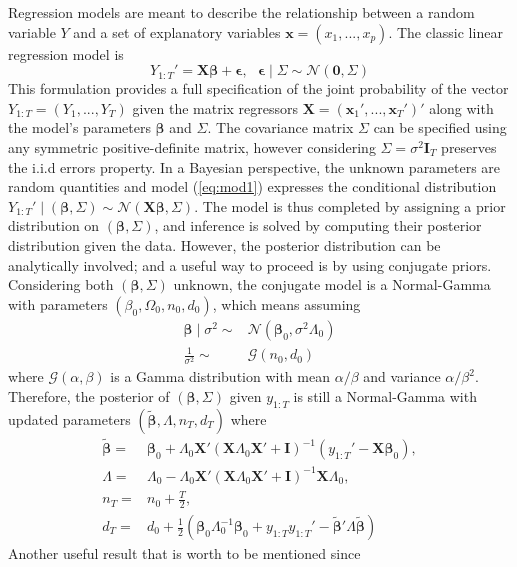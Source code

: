 \documentclass[
  12pt,
]{book}
\theoremstyle{break}
\theoremstyle{nonumberplain}
\begin{document}
Regression models are meant to describe the relationship between a
random variable \(Y\) and a set of explanatory variables
\(\boldsymbol x=(x_{1},...,x_{p})\). The classic linear regression model
is \begin{equation}\label{eq:mod1}
Y_{1:T}'=\boldsymbol{X}\boldsymbol{\beta}+\boldsymbol{\epsilon}, \ \ \ \boldsymbol{\epsilon}\mid\Sigma\sim\mathcal{N}(\boldsymbol{0},\Sigma)
\end{equation} This formulation provides a full specification of the
joint probability of the vector \(Y_{1:T}=(Y_{1},...,Y_{T})\) given the
matrix regressors
\(\boldsymbol X = (\boldsymbol x_{1}',...,\boldsymbol x_{T}')'\) along
with the model's parameters \(\boldsymbol \beta\) and \(\Sigma\). The
covariance matrix \(\Sigma\) can be specified using any symmetric
positive-definite matrix, however considering
\(\Sigma=\sigma^{2}\boldsymbol{I}_{T}\) preserves the i.i.d errors
property. In a Bayesian perspective, the unknown parameters are random
quantities and model (\ref{eq:mod1}) expresses the conditional
distribution
\(Y_{1:T}' \mid (\boldsymbol{\beta}, \Sigma) \sim \mathcal{N}(\boldsymbol{X}\boldsymbol{\beta}, \Sigma)\).
The model is thus completed by assigning a prior distribution on
\((\boldsymbol{\beta}, \Sigma)\), and inference is solved by computing
their posterior distribution given the data. However, the posterior
distribution can be analytically involved; and a useful way to proceed
is by using conjugate priors. Considering both
\((\boldsymbol \beta,\Sigma)\) unknown, the conjugate model is a
Normal-Gamma with parameters \((\beta_{0},\Omega_0,n_{0},d_{0})\), which
means assuming \begin{align*}
\boldsymbol{\beta}\mid\sigma^2 \sim & \mathcal{N}(\boldsymbol{\beta}_0,\sigma^{2}\Lambda_{0})\\
\frac{1}{\sigma^{2}}\sim & \mathcal{G}(n_{0},d_{0})
\end{align*} where \(\mathcal{G}(\alpha,\beta)\) is a Gamma distribution
with mean \(\alpha/\beta\) and variance \(\alpha/\beta^{2}\). Therefore,
the posterior of \((\boldsymbol{\beta},\Sigma)\) given \(y_{1:T}\) is
still a Normal-Gamma with updated parameters
\((\tilde{\boldsymbol{\beta}},\Lambda,n_{T},d_{T})\) where
\begin{align*}
\tilde{\boldsymbol{\beta}}= & \boldsymbol{\beta}_{0}+\Lambda_{0}\boldsymbol{X}'(\boldsymbol{X}\Lambda_{0}\boldsymbol{X}'+\boldsymbol{I})^{-1}(y_{1:T}'-\boldsymbol{X}\boldsymbol{\beta}_{0}),\\
\Lambda = & \Lambda_{0}-\Lambda_{0}\boldsymbol{X}'(\boldsymbol{X}\Lambda_{0}\boldsymbol{X}'+\boldsymbol{I})^{-1}\boldsymbol{X}\Lambda_{0},\\
n_{T}= & n_{0}+\frac{T}{2},\\
d_{T}= & d_{0}+\frac{1}{2}(\boldsymbol{\beta}_{0}\Lambda_{0}^{-1}\boldsymbol{\beta}_{0}+y_{1:T}y_{1:T}'-\tilde{\boldsymbol{\beta}}'\Lambda\tilde{\boldsymbol{\beta}})
\end{align*} Another useful result that is worth to be mentioned since
\end{document}
